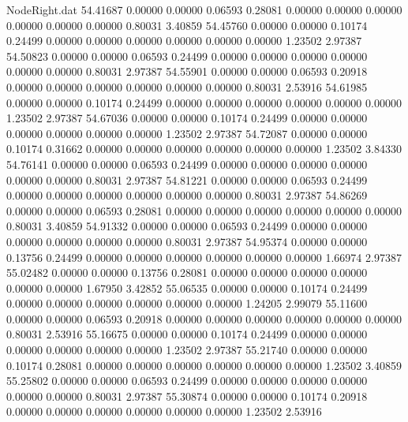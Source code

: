 \begin{filecontents}{NodeRight.dat}
  54.41687    0.00000    0.00000     0.06593    0.28081    0.00000    0.00000    0.00000    0.00000    0.00000    0.00000    0.80031    3.40859
  54.45760    0.00000    0.00000     0.10174    0.24499    0.00000    0.00000    0.00000    0.00000    0.00000    0.00000    1.23502    2.97387
  54.50823    0.00000    0.00000     0.06593    0.24499    0.00000    0.00000    0.00000    0.00000    0.00000    0.00000    0.80031    2.97387
  54.55901    0.00000    0.00000     0.06593    0.20918    0.00000    0.00000    0.00000    0.00000    0.00000    0.00000    0.80031    2.53916
  54.61985    0.00000    0.00000     0.10174    0.24499    0.00000    0.00000    0.00000    0.00000    0.00000    0.00000    1.23502    2.97387
  54.67036    0.00000    0.00000     0.10174    0.24499    0.00000    0.00000    0.00000    0.00000    0.00000    0.00000    1.23502    2.97387
  54.72087    0.00000    0.00000     0.10174    0.31662    0.00000    0.00000    0.00000    0.00000    0.00000    0.00000    1.23502    3.84330
  54.76141    0.00000    0.00000     0.06593    0.24499    0.00000    0.00000    0.00000    0.00000    0.00000    0.00000    0.80031    2.97387
  54.81221    0.00000    0.00000     0.06593    0.24499    0.00000    0.00000    0.00000    0.00000    0.00000    0.00000    0.80031    2.97387
  54.86269    0.00000    0.00000     0.06593    0.28081    0.00000    0.00000    0.00000    0.00000    0.00000    0.00000    0.80031    3.40859
  54.91332    0.00000    0.00000     0.06593    0.24499    0.00000    0.00000    0.00000    0.00000    0.00000    0.00000    0.80031    2.97387
  54.95374    0.00000    0.00000     0.13756    0.24499    0.00000    0.00000    0.00000    0.00000    0.00000    0.00000    1.66974    2.97387
  55.02482    0.00000    0.00000     0.13756    0.28081    0.00000    0.00000    0.00000    0.00000    0.00000    0.00000    1.67950    3.42852
  55.06535    0.00000    0.00000     0.10174    0.24499    0.00000    0.00000    0.00000    0.00000    0.00000    0.00000    1.24205    2.99079
  55.11600    0.00000    0.00000     0.06593    0.20918    0.00000    0.00000    0.00000    0.00000    0.00000    0.00000    0.80031    2.53916
  55.16675    0.00000    0.00000     0.10174    0.24499    0.00000    0.00000    0.00000    0.00000    0.00000    0.00000    1.23502    2.97387
  55.21740    0.00000    0.00000     0.10174    0.28081    0.00000    0.00000    0.00000    0.00000    0.00000    0.00000    1.23502    3.40859
  55.25802    0.00000    0.00000     0.06593    0.24499    0.00000    0.00000    0.00000    0.00000    0.00000    0.00000    0.80031    2.97387
  55.30874    0.00000    0.00000     0.10174    0.20918    0.00000    0.00000    0.00000    0.00000    0.00000    0.00000    1.23502    2.53916

\end{filecontents}

